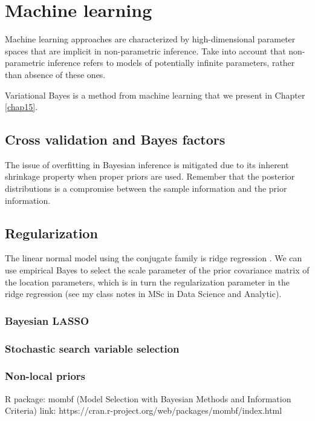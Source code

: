 \chapter{Machine learning}\label{chap13}

Machine learning approaches are characterized by high-dimensional parameter spaces that are implicit in non-parametric inference. Take into account that non-parametric inference refers to models of potentially infinite parameters, rather than absence of these ones.

Variational Bayes is a method from machine learning \cite{wainwright2008graphical} that we present in Chapter \ref{chap15}.

\section{Cross validation and Bayes factors}\label{sec13_1}
The issue of overfitting in Bayesian inference is mitigated due to its inherent shrinkage property when proper priors are used. Remember that the posterior distributions is a compromise between the sample information and the prior information.

\section{Regularization}\label{sec13_2}
The linear normal model using the conjugate family is ridge regression \cite{Ishwaran2005}. We can use empirical Bayes to select the scale parameter of the prior covariance matrix of the location parameters, which is in turn the regularization parameter in the ridge regression (see my class notes in MSc in Data Science and Analytic).

\subsection{Bayesian LASSO}\label{sec13_21}

\subsection{Stochastic search variable selection}\label{sec13_22}

\subsection{Non-local priors}\label{sec13_23}

\cite{johnson2012bayesian}
R package: mombf (Model Selection with Bayesian Methods and Information Criteria)
link: https://cran.r-project.org/web/packages/mombf/index.html

